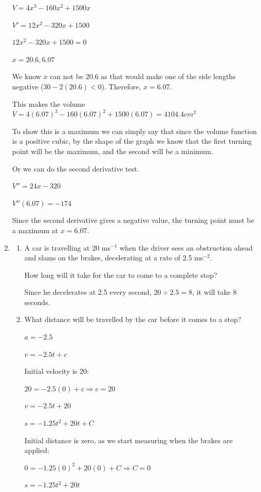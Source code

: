 \documentclass[12pt, letterpaper]{article}
\begin{document}
\begin{enumerate}[itemsep=2cm]
    $V=4x^3-160x^2+1500x$

    $V'=12x^2-320x+1500$

    $12x^2-320x+1500=0$

    $x=20.6, 6.07$

    We know $x$ can not be 20.6 as that would make one of the side lengths negative ($30-2(20.6)<0$). Therefore, $x=6.07$.

    This makes the volume $V=4(6.07)^3-160(6.07)^2+1500(6.07)=4104.4cm^2$

    To show this is a maximum we can simply say that since the volume function is a positive cubic, by the shape of the graph we know that the first turning point will be the maximum, and the second will be a minimum. 

    Or we can do the second derivative test.

    $V''=24x-320$

    $V''(6.07)=-174$

    Since the second derivative gives a negative value, the turning point must be a maximum at $x=6.07$.

    \item 
    \begin{enumerate}[itemsep=2cm]
        \item 
        A car is travelling at 20 ms$^{-1}$ when the driver sees an obstruction ahead and slams on the brakes, decelerating at a rate of 2.5 ms$^{-2}$.

        How long will it take for the car to come to a complete stop? 

        Since he decelerates at 2.5 every second, $20 \div 2.5=8$, it will take 8 seconds.

        \item 
        What distance will be travelled by the car before it comes to a stop?

        $a=-2.5$

        $v=-2.5t+c$

        Initial velocity is 20:

        $20=-2.5(0)+c \Rightarrow c=20$

        $v=-2.5t+20$

        $s=-1.25t^2+20t+C$

        Initial distance is zero, as we start measuring when the brakes are applied:

        $0=-1.25(0)^2+20(0)+C \Rightarrow C=0$

        $s=-1.25t^2+20t$


\end{enumerate}
\end{enumerate}
\end{document}
